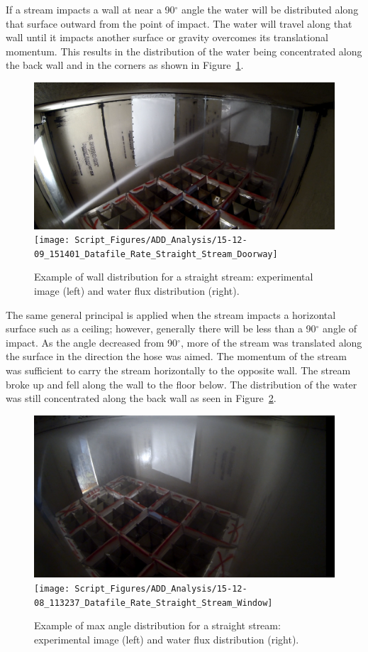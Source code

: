\documentclass[12pt,oneside]{book}
\begin{document}
If a stream impacts a wall at near a 90$^{\circ}$ angle the water will be distributed along that surface outward from the point of impact. The water will travel along that wall until it impacts another surface or gravity overcomes its translational momentum. This results in the distribution of the water being concentrated along the back wall and in the corners as shown in Figure~\ref{fig:Doorway_Atwall_Example}.

\begin{figure}[!ht]
\centering
\includegraphics[height=0.25\textwidth]{Figures/Water_Distribution/Nozzle_Directions/Interior_MaxAngleWall_SS_Inside_2} 
\texttt{[image: Script\_Figures/ADD\_Analysis/15-12-09\_151401\_Datafile\_Rate\_Straight\_Stream\_Doorway]}
\caption[Example of At Wall Distribution]{Example of wall distribution for a straight stream: experimental image (left) and water flux distribution (right).}
\label{fig:Doorway_Atwall_Example}
\end{figure}

The same general principal is applied when the stream impacts a horizontal surface such as a ceiling; however, generally there will be less than a 90$^{\circ}$ angle of impact. As the angle decreased from 90$^{\circ}$, more of the stream was translated along the surface in the direction the hose was aimed. The momentum of the stream was sufficient to carry the stream horizontally to the opposite wall. The stream broke up and fell along the wall to the floor below. The distribution of the water was still concentrated along the back wall as seen in Figure~\ref{fig:MaxAngle_Window}.

\begin{figure}[!ht]
\centering
\includegraphics[height=0.25\textwidth]{Figures/Water_Distribution/Nozzle_Directions/Exterior_MaxAngleCeiling_SS} 
\texttt{[image: Script\_Figures/ADD\_Analysis/15-12-08\_113237\_Datafile\_Rate\_Straight\_Stream\_Window]}
\caption[Example of Max Angle Distribution]{Example of max angle distribution for a straight stream: experimental image (left) and water flux distribution (right).}
\label{fig:MaxAngle_Window}
\end{figure}
\end{document}
